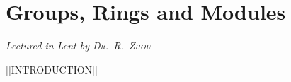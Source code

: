 \chapter[Groups, Rings and Modules \\ \textnormal{\emph{Lectured in Lent \oldstylenums{2022} by \textsc{Dr.\ R.\ Zhou}}}]{Groups, Rings and Modules}
\emph{\Large Lectured in Lent  by \textsc{Dr.\ R.\ Zhou}}

[[INTRODUCTION]]



